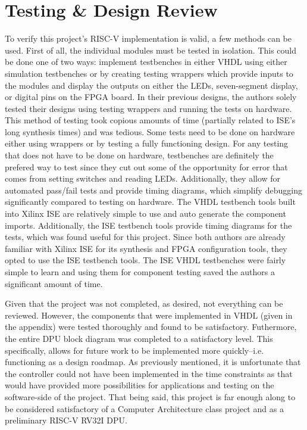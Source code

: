\documentclass[lettersize,journal]{IEEEtran}
\begin{document}
\section{Testing \& Design Review}
To verify this project's RISC-V implementation is valid, a few methods can be used. First of all, the individual modules must be tested in isolation.
This could be done one of two ways: implement testbenches in either VHDL using either simulation testbenches or by creating testing wrappers which provide inputs to the modules and display the outputs on either the LEDs, seven-segment display, or digital pins on the FPGA board.
In their previous designs, the authors solely tested their designs using testing wrappers and running the tests on hardware.
This method of testing took copious amounts of time (partially related to ISE's long synthesis times) and was tedious.
Some tests need to be done on hardware either using wrappers or by testing a fully functioning design.
For any testing that does not have to be done on hardware, testbenches are definitely the prefered way to test since they cut out some of the opportunity for error that comes from setting switches and reading LEDs.
Additionally, they allow for automated pass/fail tests and provide timing diagrams, which simplify debugging significantly compared to testing on hardware.
The VHDL testbench tools built into Xilinx ISE are relatively simple to use and auto generate the component imports.
Additionally, the ISE testbench tools provide timing diagrams for the tests, which was found useful for this project.
Since both authors are already familiar with Xilinx ISE for its synthesis and FPGA configuration tools, they opted to use the ISE testbench tools.
The ISE VHDL testbenches were fairly simple to learn and using them for component testing saved the authors a significant amount of time.

Given that the project was not completed, as desired, not everything can be reviewed.
However, the components that were implemented in VHDL (given in the appendix) were tested thoroughly and found to be satisfactory.
Futhermore, the entire DPU block diagram was completed to a satisfactory level.
This specifically, allows for future work to be implemented more quickly--i.e. functioning as a design roadmap.
As previously mentioned, it is unfortunate that the controller could not have been implemented in the time constraints as that would have provided more possibilities for applications and testing on the software-side of the project.
That being said, this project is far enough along to be considered satisfactory of a Computer Architecture class project and as a preliminary RISC-V RV32I DPU.
\end{document}
